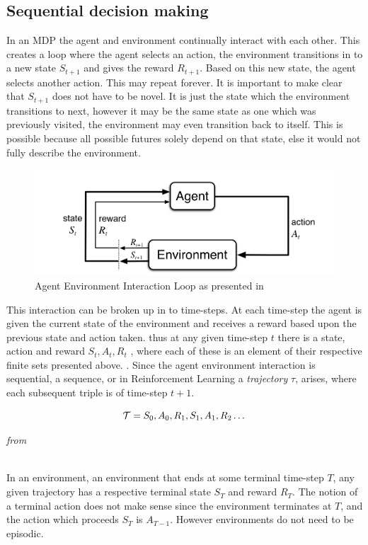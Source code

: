 \subsection{Sequential decision making}\label{subsec:sequential_decision_making}
In an MDP the agent and environment continually interact with each other. This creates a loop where the agent selects an action, the environment transitions in to a new state $S_{t+1}$ and gives the reward $R_{t+1}$. Based on this new state, the agent selects another action. This may repeat forever. It is important to make clear that $S_{t+1}$ does not have to be novel. It is just the state which the environment transitions to next, however it may be the same state as one which was previously visited, the environment may even transition back to itself. This is possible because all possible futures solely depend on that state, else it would not fully describe the environment.

\begin{figure}[h!]
    \centering
    \includegraphics[width=0.7\linewidth]{figures/agent_environment_interaction_loop.png}
    \caption{Agent Environment Interaction Loop as presented in }
    \label{fig:agent_env_inter}
\end{figure}

\noindent
This interaction can be broken up in to time-steps. At each time-step the agent is given the current state of the environment and receives a reward based upon the previous state and action taken. thus at any given time-step $t$ there is a state, action and reward $S_t, A_t, R_t$ , where each of these is an element of their respective finite sets presented above. . Since the agent environment interaction is sequential, a sequence, or in Reinforcement Learning a \textit{trajectory} $\tau$, arises, where each subsequent triple is of time-step $t+1$. 

\begin{equation}\label{MDP:trajectory}
    \mathcal{T} = S_0, A_0, R_1, S_1, A_1, R_2 \dots
\end{equation}
\centerline{\small\textit{from }}

\noindent
\\ In an  environment, an environment that ends at some terminal time-step $T$, any given trajectory has a respective terminal state $S_T$ and reward $R_T$. The notion of a terminal action does not make sense since the environment terminates at $T$, and the action which proceeds $S_T$ is $A_{T-1}$.  However environments do not need to be episodic.

